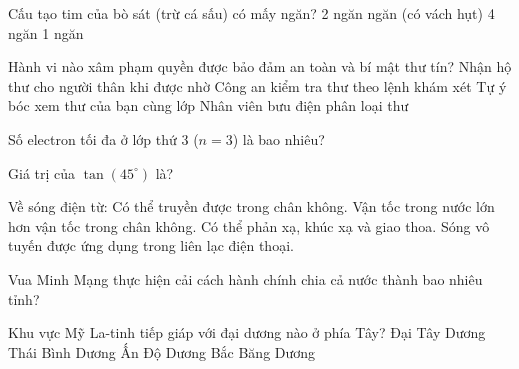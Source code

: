 \begin{ex}
    Cấu tạo tim của bò sát (trừ cá sấu) có mấy ngăn?
    \choice
    {2 ngăn}
    { ngăn (có vách hụt)}
    {4 ngăn}
    {1 ngăn}
\end{ex}

\begin{ex}
    Hành vi nào xâm phạm quyền được bảo đảm an toàn và bí mật thư tín?
    \choice
    {Nhận hộ thư cho người thân khi được nhờ}
    {Công an kiểm tra thư theo lệnh khám xét}
    {\True Tự ý bóc xem thư của bạn cùng lớp}
    {Nhân viên bưu điện phân loại thư}
\end{ex}

\begin{ex}
    Số electron tối đa ở lớp thứ 3 ($n=3$) là bao nhiêu?
\end{ex}

\begin{ex}
    Giá trị của $\tan(45^\circ)$ là?
\end{ex}

\begin{ex}
    Về sóng điện từ:
    \choiceTF
    {\True Có thể truyền được trong chân không.}
    {Vận tốc trong nước lớn hơn vận tốc trong chân không.}
    {\True Có thể phản xạ, khúc xạ và giao thoa.}
    {\True Sóng vô tuyến được ứng dụng trong liên lạc điện thoại.}
\end{ex}

\begin{ex}
    Vua Minh Mạng thực hiện cải cách hành chính chia cả nước thành bao nhiêu tỉnh?
\end{ex}

\begin{ex}
    Khu vực Mỹ La-tinh tiếp giáp với đại dương nào ở phía Tây?
    \choice
    {Đại Tây Dương}
    {\True Thái Bình Dương}
    {Ấn Độ Dương}
    {Bắc Băng Dương}
\end{ex}


